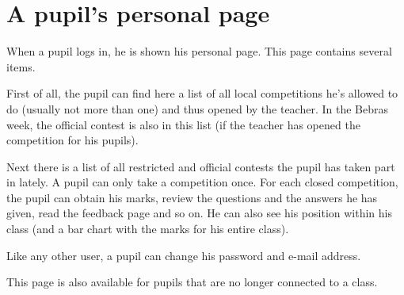 \section{A pupil's personal page}

When a pupil logs in, he is shown his personal page. This page contains several
items.
  
First of all, the pupil can find here a list of all local competitions he's
allowed to do (usually not more than one) and thus opened by the teacher. In
the Bebras week, the official contest is also in this list (if the teacher
has opened the competition for his pupils).

Next there is a list of all restricted and official contests the pupil has
taken part in lately. A pupil can only take a competition once. For each
closed competition, the pupil can obtain his marks, review the questions and
the answers he has given, read the feedback page and so on. He can also see
his position within his class (and a bar chart with the marks for his entire
class).

Like any other user, a pupil can change his password and e-mail address.  

This page is also available for pupils that are no longer connected to a
class.
